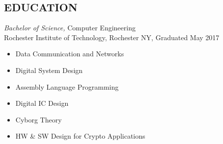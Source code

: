 \documentclass[line,mmmargin]{res}
\begin{document}
\begin{resume}
\section{EDUCATION} {\sl Bachelor of Science,} Computer Engineering \\ %
                Rochester Institute of Technology, Rochester NY, 
				Graduated May 2017 %
				\begin{multicols}{2}
					\begin{itemize}
						\itemsep -2pt
						\item[] Data Communication and Networks
						\item[] Digital System Design
						\item[] Assembly Language Programming
						\item[] Digital IC Design
						\item[] Cyborg Theory
						\item[] HW \& SW Design for Crypto Applications


						
					\end{itemize}
				\end{multicols}
 

\end{resume}
\end{document}
